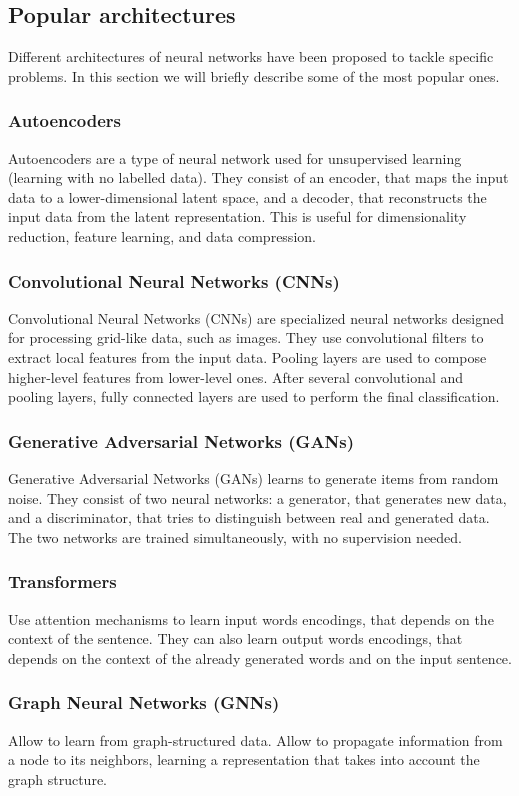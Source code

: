 \subsection{Popular architectures}
Different architectures of neural networks have been proposed to tackle specific problems. In this section we will briefly describe some of the most popular ones.
\subsubsection*{Autoencoders}
Autoencoders are a type of neural network used for unsupervised learning (learning with no labelled data). They consist of an
encoder, that maps the input data to a lower-dimensional latent space, and a decoder, that reconstructs the input data from the latent representation.
This is useful for dimensionality reduction, feature learning, and data compression.
\subsubsection*{Convolutional Neural Networks (CNNs)}
Convolutional Neural Networks (CNNs) are specialized neural networks designed for processing grid-like data, such as images. 
They use convolutional filters to extract local features from the input data. Pooling layers are used to compose higher-level features from lower-level ones.
After several convolutional and pooling layers, fully connected layers are used to perform the final classification.
\subsubsection*{Generative Adversarial Networks (GANs)}
Generative Adversarial Networks (GANs) learns to generate items from random noise. 
They consist of two neural networks: a generator, that generates new data, and a discriminator, that tries to distinguish between real and generated data.
The two networks are trained simultaneously, with no supervision needed.
\subsubsection*{Transformers}
Use attention mechanisms to learn input words encodings, that depends on the context of the sentence.
They can also learn output words encodings, that depends on the context of the already generated words and on the input sentence.
\subsubsection*{Graph Neural Networks (GNNs)}
Allow to learn from graph-structured data. Allow to propagate information from a node to its neighbors, learning a representation that takes into account the graph structure.
